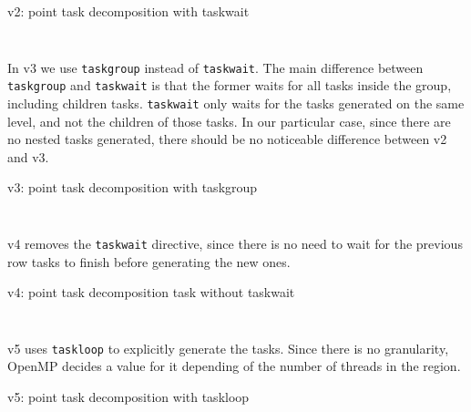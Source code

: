 \begin{listing}[H]
    \centering
    \caption{v2: point task decomposition with taskwait}
    \inputminted[firstline=91,lastline=98]{c}{sources/mandel-omp-v2.c}
    \vspace{-2em}
    \inputminted[firstline=132,lastline=134]{c}{sources/mandel-omp-v2.c}
    \label{lst:v2} 
\end{listing}

\pagebreak

In v3 we use \texttt{taskgroup} instead of \texttt{taskwait}. The main difference between \texttt{taskgroup}
and \texttt{taskwait} is that the former waits for all tasks inside the group, including children tasks.
\texttt{taskwait} only waits for the tasks generated on the same level, and not the children of those tasks.
In our particular case, since there are no nested tasks generated, there should be no noticeable 
difference between v2 and v3.

\begin{listing}[H]
    \centering
    \caption{v3: point task decomposition with taskgroup}
    \inputminted[firstline=91,lastline=98]{c}{sources/mandel-omp-v3.c}
    \vspace{-2em}
    \inputminted[firstline=133,lastline=135]{c}{sources/mandel-omp-v3.c}
    \label{lst:v3} 
\end{listing}

v4 removes the \texttt{taskwait} directive, since there is no need to wait for the previous row tasks
to finish before generating the new ones.

\begin{listing}[H]
    \centering
    \caption{v4: point task decomposition task without taskwait}
    \inputminted[firstline=91,lastline=98]{c}{sources/mandel-omp-v4.c}
    \vspace{-2em}
    \inputminted[firstline=131,lastline=133]{c}{sources/mandel-omp-v4.c}
    \label{lst:v4} 
\end{listing}

\pagebreak

v5 uses \texttt{taskloop} to explicitly generate the tasks. Since there is no granularity, OpenMP
decides a value for it depending of the number of threads in the region.

\begin{listing}[H]
    \centering
    \caption{v5: point task decomposition with taskloop}
    \inputminted[firstline=91,lastline=98]{c}{sources/mandel-omp-v5.c}
    \label{lst:v5} 
\end{listing}

